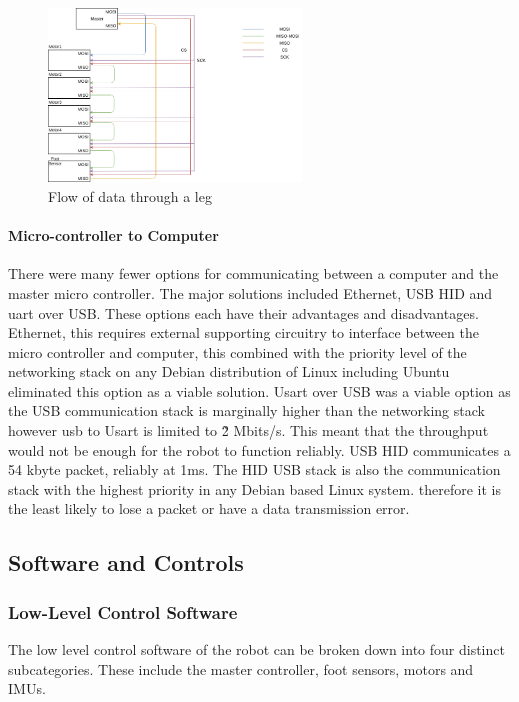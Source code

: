    \begin{figure}[H]
       \centering
       \includegraphics[width=0.6\textwidth]{figures/Leg_Flow_Dragram.png}
       \caption{Flow of data through a leg}
       \label{fig:my_label}
   \end{figure}
        \paragraph{Micro-controller to Computer}
        There were many fewer options for communicating between a computer and the master micro controller. The major solutions included Ethernet, USB HID and uart over USB. These options each have their advantages and disadvantages. Ethernet, this requires external supporting circuitry to interface between the micro controller and computer, this combined with the priority level of the networking stack on any Debian distribution of Linux including Ubuntu eliminated this option as a viable solution. Usart over USB was a viable option as the USB communication stack is marginally higher than the networking stack however usb to Usart is limited to \~2 Mbits/s. This meant that the throughput would not be enough for the robot to function reliably. USB HID communicates a 54 kbyte packet, reliably at 1ms. The HID USB stack is also the communication stack with the highest priority in any Debian based Linux system. therefore it is the least likely to lose a packet or have a data transmission error. 

\subsection{Software and Controls}

\subsubsection{Low-Level Control Software} 
The low level control software of the robot can be broken down into four distinct subcategories. These include the master controller, foot sensors, motors and IMUs. 
